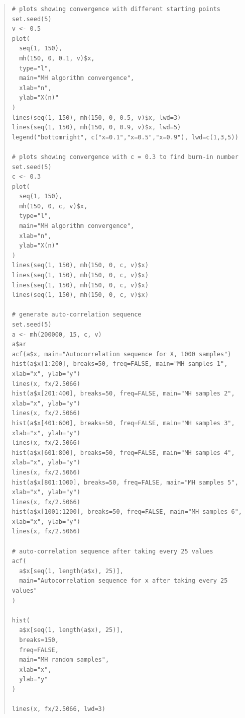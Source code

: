 \documentclass[11pt, a4paper]{article}
\begin{document}
\begin{quote}
\begin{verbatim}
# plots showing convergence with different starting points
set.seed(5)
v <- 0.5
plot(
  seq(1, 150),
  mh(150, 0, 0.1, v)$x,
  type="l",
  main="MH algorithm convergence",
  xlab="n",
  ylab="X(n)"
)
lines(seq(1, 150), mh(150, 0, 0.5, v)$x, lwd=3)
lines(seq(1, 150), mh(150, 0, 0.9, v)$x, lwd=5)
legend("bottomright", c("x=0.1","x=0.5","x=0.9"), lwd=c(1,3,5))

# plots showing convergence with c = 0.3 to find burn-in number
set.seed(5)
c <- 0.3
plot(
  seq(1, 150),
  mh(150, 0, c, v)$x,
  type="l",
  main="MH algorithm convergence",
  xlab="n",
  ylab="X(n)"
)
lines(seq(1, 150), mh(150, 0, c, v)$x)
lines(seq(1, 150), mh(150, 0, c, v)$x)
lines(seq(1, 150), mh(150, 0, c, v)$x)
lines(seq(1, 150), mh(150, 0, c, v)$x)

# generate auto-correlation sequence
set.seed(5)
a <- mh(200000, 15, c, v)
a$ar
acf(a$x, main="Autocorrelation sequence for X, 1000 samples")
hist(a$x[1:200], breaks=50, freq=FALSE, main="MH samples 1", xlab="x", ylab="y")
lines(x, fx/2.5066)
hist(a$x[201:400], breaks=50, freq=FALSE, main="MH samples 2", xlab="x", ylab="y")
lines(x, fx/2.5066)
hist(a$x[401:600], breaks=50, freq=FALSE, main="MH samples 3", xlab="x", ylab="y")
lines(x, fx/2.5066)
hist(a$x[601:800], breaks=50, freq=FALSE, main="MH samples 4", xlab="x", ylab="y")
lines(x, fx/2.5066)
hist(a$x[801:1000], breaks=50, freq=FALSE, main="MH samples 5", xlab="x", ylab="y")
lines(x, fx/2.5066)
hist(a$x[1001:1200], breaks=50, freq=FALSE, main="MH samples 6", xlab="x", ylab="y")
lines(x, fx/2.5066)

# auto-correlation sequence after taking every 25 values
acf(
  a$x[seq(1, length(a$x), 25)],
  main="Autocorrelation sequence for x after taking every 25 values"
)

hist(
  a$x[seq(1, length(a$x), 25)],
  breaks=150, 
  freq=FALSE,
  main="MH random samples",
  xlab="x",
  ylab="y"
)

lines(x, fx/2.5066, lwd=3)
\end{verbatim}
\end{quote}
\end{document}
